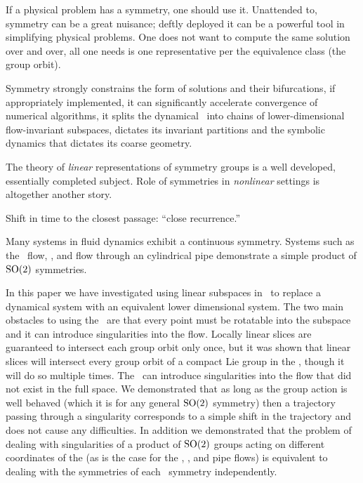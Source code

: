 

If a physical problem has a symmetry, one should use it.
Unattended to, symmetry can be a great nuisance; deftly deployed
it can be a powerful tool in simplifying physical problems.
One does not want to compute the same solution over and over, all
one needs is one representative per the equivalence class (the group orbit).

Symmetry strongly constrains the form of solutions and their bifurcations,
if appropriately implemented, it can significantly accelerate
convergence of numerical algorithms,
it splits the dynamical \statesp\ into chains of lower-dimensional flow-invariant
subspaces, dictates its invariant partitions and the symbolic dynamics that dictates its coarse geometry.

The theory of \emph{linear} representations of symmetry groups is 
a well developed, essentially completed subject. Role of symmetries in
\emph{nonlinear} settings is altogether another story.

Shift in time to the closest passage: ``close recurrence.''

Many systems in fluid dynamics exhibit a continuous symmetry. Systems
such as the \KS\ flow,
{\pCf}, and flow through an
cylindrical pipe demonstrate a simple product of
$\textrm{SO}(2)$ symmetries.

In this paper we have investigated using linear subspaces in
\mslices\ to replace a dynamical system with an equivalent
lower dimensional system. The two main obstacles to using the \mslices\
are that every point must be rotatable into the subspace and it can
introduce singularities into the flow. Locally linear slices are
guaranteed to intersect each group orbit only once, but it was shown that
linear slices will intersect every group orbit of a compact Lie group in
the {\statesp}, though it will do so multiple times. The \mslices\ can
introduce singularities into the flow that did not exist in the full
space. We demonstrated that as long as the group action is well behaved
(which it is for any general $\textrm{SO}(2)$ symmetry) then a trajectory
passing through a singularity corresponds to a simple shift in the
trajectory and does not cause any difficulties. In addition we
demonstrated that the problem of dealing with singularities of a product
of $\textrm{SO}(2)$ groups acting on different coordinates of the {\statesp}
(as is the case for the \KS\rf{ku,siv},
{\pCf}, and
pipe flows) is equivalent to dealing with the
symmetries of each \SOn{2}\ symmetry independently.



